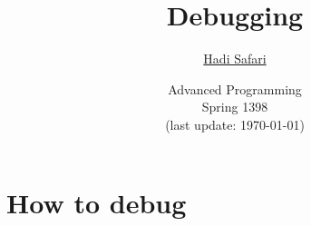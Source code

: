 \documentclass[xcolor={dvipsnames}]{beamer}
\title{Debugging}
\author{\href{mailto:hadi.safari@ut.ac.ir?subject=[AP\%20S98]\%20}{Hadi Safari}}
\institute[University of Tehran]{
    \resizebox{!}{10ex}{}\\
    University of Tehran
}
\date[Advanced Programming (S98)]{
    Advanced Programming\\
    \small Spring 1398\\
    \footnotesize (last update: \today)
}
\begin{document}
\frame{\titlepage}



\section{How to debug}



\end{document}
